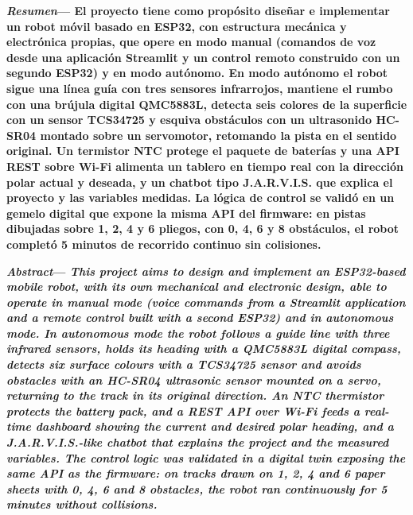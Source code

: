 \documentclass[10pt,a4paper,twocolumn]{article}
\begin{document}

\noindent\textbf{\textit{Resumen}— El proyecto tiene como propósito diseñar e implementar un robot móvil basado en ESP32, con estructura mecánica y electrónica propias, que opere en modo manual (comandos de voz desde una aplicación Streamlit y un control remoto construido con un segundo ESP32) y en modo autónomo. En modo autónomo el robot sigue una línea guía con tres sensores infrarrojos, mantiene el rumbo con una brújula digital QMC5883L, detecta seis colores de la superficie con un sensor TCS34725 y esquiva obstáculos con un ultrasonido HC-SR04 montado sobre un servomotor, retomando la pista en el sentido original. Un termistor NTC protege el paquete de baterías y una API REST sobre Wi-Fi alimenta un tablero en tiempo real con la dirección polar actual y deseada, y un chatbot tipo J.A.R.V.I.S. que explica el proyecto y las variables medidas. La lógica de control se validó en un gemelo digital que expone la misma API del firmware: en pistas dibujadas sobre 1, 2, 4 y 6 pliegos, con 0, 4, 6 y 8 obstáculos, el robot completó 5 minutos de recorrido continuo sin colisiones.}

\vspace{0.2cm}
\noindent\textbf{\textit{Abstract}— \textit{This project aims to design and implement an ESP32-based mobile robot, with its own mechanical and electronic design, able to operate in manual mode (voice commands from a Streamlit application and a remote control built with a second ESP32) and in autonomous mode. In autonomous mode the robot follows a guide line with three infrared sensors, holds its heading with a QMC5883L digital compass, detects six surface colours with a TCS34725 sensor and avoids obstacles with an HC-SR04 ultrasonic sensor mounted on a servo, returning to the track in its original direction. An NTC thermistor protects the battery pack, and a REST API over Wi-Fi feeds a real-time dashboard showing the current and desired polar heading, and a J.A.R.V.I.S.-like chatbot that explains the project and the measured variables. The control logic was validated in a digital twin exposing the same API as the firmware: on tracks drawn on 1, 2, 4 and 6 paper sheets with 0, 4, 6 and 8 obstacles, the robot ran continuously for 5 minutes without collisions.}}
\end{document}
